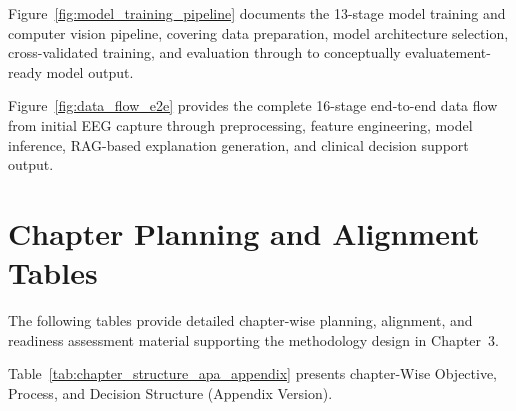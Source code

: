 
Figure~\ref{fig:model_training_pipeline} documents the 13-stage model training and computer vision pipeline, covering data preparation, model architecture selection, cross-validated training, and evaluation through to conceptually evaluatement-ready model output.




Figure~\ref{fig:data_flow_e2e} provides the complete 16-stage end-to-end data flow from initial EEG capture through preprocessing, feature engineering, model inference, RAG-based explanation generation, and clinical decision support output.





\section*{Chapter Planning and Alignment Tables}

\noindent The following tables provide detailed chapter-wise planning, alignment, and readiness assessment material supporting the methodology design in Chapter~3.

\tablefontsize
\noindent Table~\ref{tab:chapter_structure_apa_appendix} presents chapter-Wise Objective, Process, and Decision Structure (Appendix Version).

